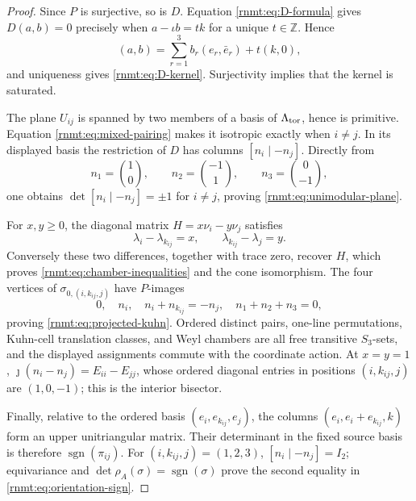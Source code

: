 \begin{proof}
Since \(P\) is surjective, so is \(D\).  Equation
\eqref{rnmt:eq:D-formula} gives \(D(a,b)=0\) precisely when
\(a-\iota b=tk\) for a unique \(t\in\mathbb Z\).  Hence
\[
 (a,b)=\sum_{r=1}^3 b_r(e_r,\bar e_r)+t(k,0),
\]
and uniqueness gives \eqref{rnmt:eq:D-kernel}.  Surjectivity implies that
the kernel is saturated.

The plane \(U_{ij}\) is spanned by two members of a basis of
\(\Lambda_{\rm tor}\), hence is primitive.  Equation
\eqref{rnmt:eq:mixed-pairing} makes it isotropic exactly when \(i\ne j\).
In its displayed basis the restriction of \(D\) has columns
\([n_i\mid-n_j]\).  Directly from
\[
 n_1=\binom10,\qquad n_2=\binom{-1}{1},\qquad
 n_3=\binom0{-1},
\]
one obtains
\(\det[n_i\mid-n_j]=\pm1\) for \(i\ne j\), proving
\eqref{rnmt:eq:unimodular-plane}.

For \(x,y\geq0\), the diagonal matrix
\(H=x\nu_i-y\nu_j\) satisfies
\[
 \lambda_i-\lambda_{k_{ij}}=x,\qquad
 \lambda_{k_{ij}}-\lambda_j=y.
\]
Conversely these two differences, together with trace zero, recover \(H\),
which proves \eqref{rnmt:eq:chamber-inequalities} and the cone
isomorphism.  The four vertices of
\(\sigma_{0,(i,k_{ij},j)}\) have \(P\)-images
\[
 0,\quad n_i,\quad n_i+n_{k_{ij}}=-n_j,\quad
 n_1+n_2+n_3=0,
\]
proving \eqref{rnmt:eq:projected-kuhn}.  Ordered distinct pairs, one-line
permutations, Kuhn-cell translation classes, and Weyl chambers are all free
transitive \(S_3\)-sets, and the displayed assignments commute with the
coordinate action.  At \(x=y=1\),
\(\jmath(n_i-n_j)=E_{ii}-E_{jj}\), whose ordered diagonal entries in
positions \((i,k_{ij},j)\) are \((1,0,-1)\); this is the interior bisector.

Finally, relative to the ordered basis
\((e_i,e_{k_{ij}},e_j)\), the columns
\((e_i,e_i+e_{k_{ij}},k)\) form an upper unitriangular matrix.  Their
determinant in the fixed source basis is therefore
\(\operatorname{sgn}(\pi_{ij})\).  For \((i,k_{ij},j)=(1,2,3)\),
\([n_i\mid-n_j]=I_2\); equivariance and
\(\det\rho_A(\sigma)=\operatorname{sgn}(\sigma)\) prove the second equality
in \eqref{rnmt:eq:orientation-sign}.
\end{proof}

